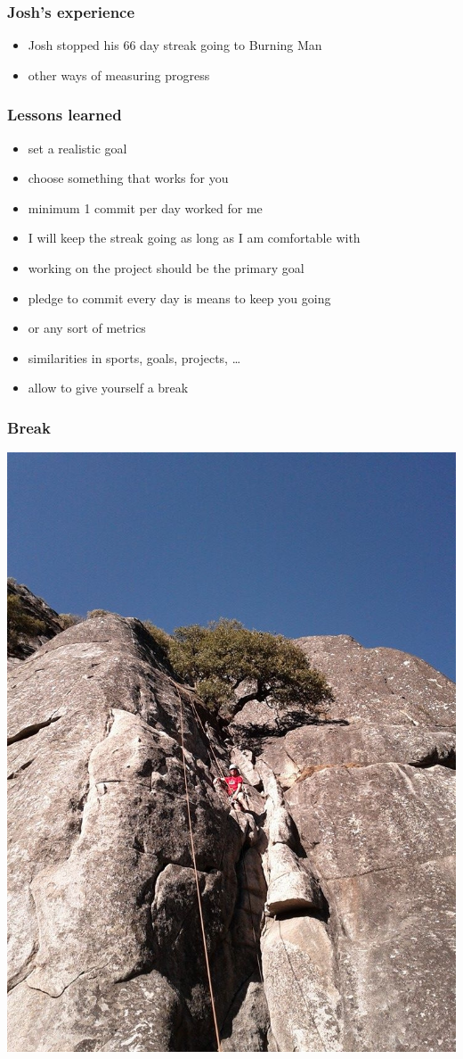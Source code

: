 \documentclass[14pt]{beamer}
\begin{document}
  \begin{frame}
    \frametitle{Josh's experience}
    \begin{itemize}
      \item Josh stopped his 66 day streak going to Burning Man
      \item other ways of measuring progress
    \end{itemize}
  \end{frame}
  \begin{frame}
    \frametitle{Lessons learned}
    \begin{itemize}
      \item set a realistic goal
      \item choose something that works for you
      \item minimum 1 commit per day worked for me
      \item I will keep the streak going as long as I am comfortable with
      \item working on the project should be the primary goal
      \item pledge to commit every day is means to keep you going
      \item or any sort of metrics
      \item similarities in sports, goals, projects, \ldots
      \item allow to give yourself a break
    \end{itemize}
  \end{frame}
  \begin{frame}
    \frametitle{Break}
    \includegraphics[scale=.25]{climbing.jpg}
  \end{frame}
\end{document}
